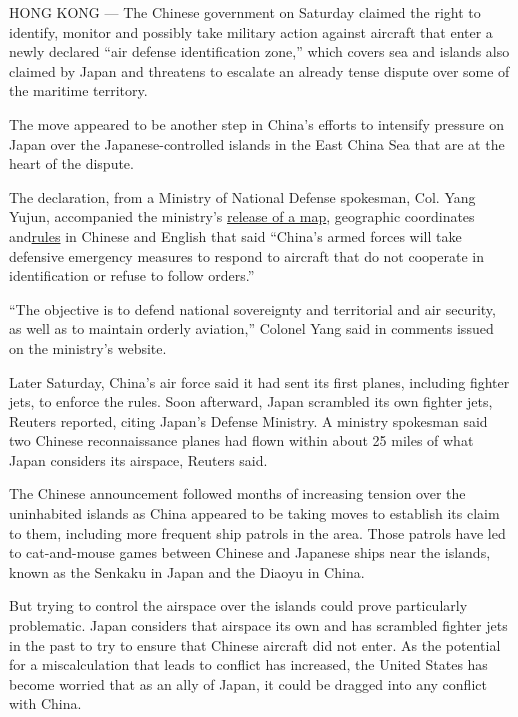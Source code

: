 HONG KONG --- The Chinese government on Saturday claimed the right to
identify, monitor and possibly take military action against aircraft
that enter a newly declared ``air defense identification zone,'' which
covers sea and islands also claimed by Japan and threatens to escalate
an already tense dispute over some of the maritime territory.

The move appeared to be another step in China's efforts to intensify
pressure on Japan over the Japanese-controlled islands in the East China
Sea that are at the heart of the dispute.

The declaration, from a Ministry of National Defense spokesman, Col.
Yang Yujun, accompanied the ministry's
\href{http://eng.mod.gov.cn/HomePicture/2013-11/23/content_4476177.htm}{release
of a map}, geographic coordinates
and\href{http://eng.mod.gov.cn/TopNews/2013-11/23/content_4476138.htm}{rules}
in Chinese and English that said ``China's armed forces will take
defensive emergency measures to respond to aircraft that do not
cooperate in identification or refuse to follow orders.''

``The objective is to defend national sovereignty and territorial and
air security, as well as to maintain orderly aviation,'' Colonel Yang
said in comments issued on the ministry's website.

Later Saturday, China's air force said it had sent its first planes,
including fighter jets, to enforce the rules. Soon afterward, Japan
scrambled its own fighter jets, Reuters reported, citing Japan's Defense
Ministry. A ministry spokesman said two Chinese reconnaissance planes
had flown within about 25 miles of what Japan considers its airspace,
Reuters said.

The Chinese announcement followed months of increasing tension over the
uninhabited islands as China appeared to be taking moves to establish
its claim to them, including more frequent ship patrols in the area.
Those patrols have led to cat-and-mouse games between Chinese and
Japanese ships near the islands, known as the Senkaku in Japan and the
Diaoyu in China.

But trying to control the airspace over the islands could prove
particularly problematic. Japan considers that airspace its own and has
scrambled fighter jets in the past to try to ensure that Chinese
aircraft did not enter. As the potential for a miscalculation that leads
to conflict has increased, the United States has become worried that as
an ally of Japan, it could be dragged into any conflict with China.

